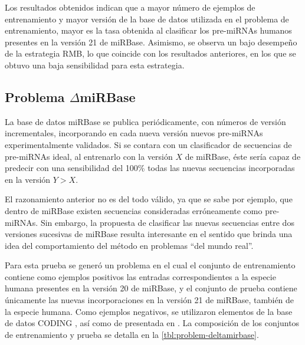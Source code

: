 Los resultados obtenidos indican que a mayor número de ejemplos de
entrenamiento y mayor versión de la base de datos utilizada en el
problema de entrenamiento, mayor es la tasa obtenida al clasificar los
pre-miRNAs humanos presentes en la versión 21 de miRBase.  Asimismo,
se observa un bajo desempeño de la estrategia RMB, lo que coincide con
los resultados anteriores, en los que se obtuvo una baja sensibilidad
para esta estrategia.

\subsection{Problema $\mathbf{\mathsf{\Delta}}$miRBase}
La base de datos miRBase se publica periódicamente, con números de
versión incrementales, incorporando en cada nueva versión nuevos
pre-miRNAs experimentalmente validados.  Si se contara con un
clasificador de secuencias de pre-miRNAs ideal, al entrenarlo con la
versión $X$ de miRBase, éste sería capaz de predecir con una
sensibilidad del 100\% todas las nuevas secuencias incorporadas en la
versión $Y>X$.

El razonamiento anterior no es del todo válido, ya que se sabe por
ejemplo, que dentro de miRBase existen secuencias consideradas
erróneamente como pre-miRNAs.  Sin embargo, la propuesta de clasificar
las nuevas secuencias entre dos versiones sucesivas de miRBase resulta
interesante en el sentido que brinda una idea del comportamiento del
método en problemas ``del mundo real''.

Para esta prueba se generó un problema \deltamirbase{} en el cual el conjunto de entrenamiento
contiene como ejemplos positivos  las entradas correspondientes
a la especie humana presentes en la versión 20 de miRBase,
y el conjunto de prueba contiene únicamente las nuevas incorporaciones
en la versión 21 de miRBase, también de la especie humana.
Como ejemplos negativos, se utilizaron elementos de la base de datos CODING \cite{xue},
así como de  presentada en \cite{batuwita}.
La composición de los conjuntos de entrenamiento y prueba se detalla en
la \autoref{tbl:problem-deltamirbase}.